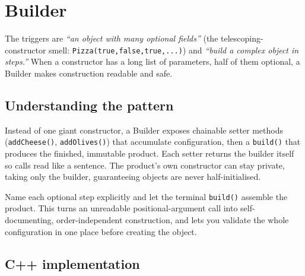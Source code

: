 \section{Builder}
\label{sec:pat-builder}


\begin{patternbox}
The triggers are \emph{``an object with many optional fields''} (the
telescoping-constructor smell: \texttt{Pizza(true,false,true,...)}) and
\emph{``build a complex object in steps.''} When a constructor has a long
list of parameters, half of them optional, a Builder makes construction
readable and safe.
\end{patternbox}

\subsection*{Understanding the pattern}

Instead of one giant constructor, a Builder exposes chainable setter
methods (\texttt{addCheese()}, \texttt{addOlives()}) that accumulate
configuration, then a \texttt{build()} that produces the finished,
immutable product. Each setter returns the builder itself so calls read
like a sentence. The product's own constructor can stay private, taking
only the builder, guaranteeing objects are never half-initialised.

\begin{ideabox}
Name each optional step explicitly and let the terminal \texttt{build()}
assemble the product. This turns an unreadable positional-argument call
into self-documenting, order-independent construction, and lets you
validate the whole configuration in one place before creating the object.
\end{ideabox}

\subsection*{C++ implementation}


